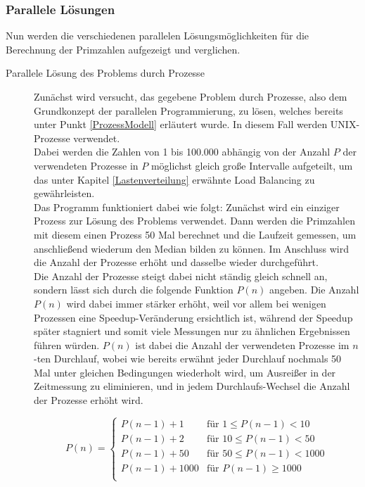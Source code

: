 			\subsubsection{Parallele Lösungen}
			
				Nun werden die verschiedenen parallelen Lösungsmöglichkeiten für die Berechnung der Primzahlen aufgezeigt und verglichen.
				
				\begin{description}
					
					\item[Parallele Lösung des Problems durch Prozesse]
					
						Zunächst wird versucht, das gegebene Problem durch Prozesse, also dem Grundkonzept der parallelen Programmierung, zu lösen, welches bereits unter Punkt \ref{ProzessModell} erläutert wurde. In diesem Fall werden UNIX-Prozesse verwendet.\\
						Dabei werden die Zahlen von 1 bis 100.000 abhängig von der Anzahl $P$ der verwendeten Prozesse in $P$ möglichst gleich große Intervalle aufgeteilt, um das unter Kapitel \ref{Lastenverteilung} erwähnte Load Balancing zu gewährleisten.\\
						Das Programm funktioniert dabei wie folgt: Zunächst wird ein einziger Prozess zur Lösung des Problems verwendet. Dann werden die Primzahlen mit diesem einen Prozess 50 Mal berechnet und die Laufzeit gemessen, um anschließend wiederum den Median bilden zu können. Im Anschluss wird die Anzahl der Prozesse erhöht und dasselbe wieder durchgeführt.\\
						Die Anzahl der Prozesse steigt dabei nicht ständig gleich schnell an, sondern lässt sich durch die folgende Funktion $P(n)$ angeben. Die Anzahl $P(n)$ wird dabei immer stärker erhöht, weil vor allem bei wenigen Prozessen eine Speedup-Veränderung ersichtlich ist, während der Speedup später stagniert und somit viele Messungen nur zu ähnlichen Ergebnissen führen würden. $P(n)$ ist dabei die Anzahl der verwendeten Prozesse im $n$-ten Durchlauf, wobei wie bereits erwähnt jeder Durchlauf nochmals 50 Mal unter gleichen Bedingungen wiederholt wird, um Ausreißer in der Zeitmessung zu eliminieren, und in jedem Durchlaufs-Wechsel die Anzahl der Prozesse erhöht wird.
						
						\begin{equation}
							P(n) =
							\begin{cases}
								P(n - 1) + 1 & \text{für } 1 \leq P(n - 1) < 10\\
								P(n - 1) + 2 & \text{für } 10 \leq P(n - 1) < 50\\
								P(n - 1) + 50 & \text{für } 50 \leq P(n - 1) < 1000\\
								P(n - 1) + 1000 & \text{für } P(n - 1) \geq 1000\\
							\end{cases}
						\end{equation}
						

\end{description}
